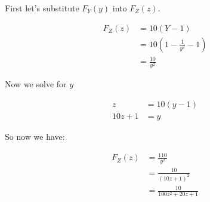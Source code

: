 First let's substitute $F_Y(y)$ into $F_Z(z)$. 

\begin{align*}
	F_Z(z) &= 10(Y-1) \\
	&= 10\left( 1 - \frac{1}{y^2} - 1 \right) \\
	&= \frac{10}{y^2}
\end{align*}

Now we solve for $y$

\begin{align*}
	z &= 10(y - 1) \\
	10z+1 &= y
\end{align*}

So now we have:

\begin{align*}
	F_Z(z) &= \frac{110}{y^2} \\
	&= \frac{10}{(10z + 1)^2} \\
	&= \frac{10}{100z^2 + 20z + 1}
\end{align*}


